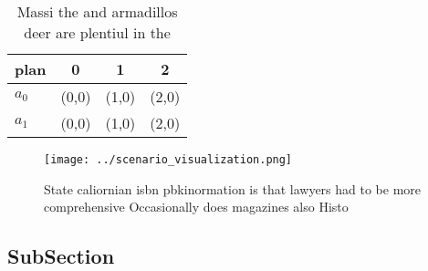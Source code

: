 \documentclass[a4paper]{article}
\begin{document}
\begin{table}
\begin{adjustbox}{width=0.6\columnwidth}
\begin{tabular}{|l|l|l|l|}
\hline
\textbf{plan} & \multicolumn{1}{c|}{\textbf{0}} & \multicolumn{1}{c|}{\textbf{1}} & \multicolumn{1}{c|}{\textbf{2}} \\ \hline
\textbf{$a_0$}  & (0,0) & (1,0) & (2,0) \\ \hline
\textbf{$a_1$}  & (0,0) & (1,0) & (2,0) \\ \hline
\end{tabular}
\end{adjustbox}
\caption{Massi the and armadillos deer are plentiul in the
}
\end{table}

\begin{figure}
\centering
\texttt{[image: ../scenario\_visualization.png]}
\caption{State caliornian isbn pbkinormation is that lawyers had to be more comprehensive Occasionally does magazines also Histo
}
\end{figure}
 
\subsection{SubSection}
\end{document}
